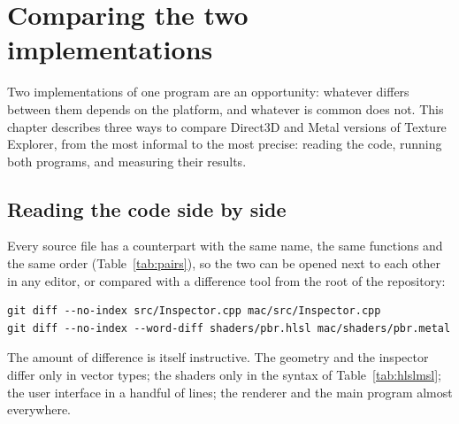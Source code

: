 \chapter{Comparing the two implementations}
\label{ch:comparing}

Two implementations of one program are an opportunity: whatever differs between them depends
on the platform, and whatever is common does not. This chapter describes three ways to compare
Direct3D and Metal versions of Texture Explorer, from the most informal to the most precise:
reading the code, running both programs, and measuring their results.

\section{Reading the code side by side}
Every source file has a counterpart with the same name, the same functions and the same order
(Table~\ref{tab:pairs}), so the two can be opened next to each other in any editor, or compared
with a difference tool from the root of the repository:
\begin{lstlisting}[language={},numbers=none,frame=none,basicstyle=\ttfamily\small]
git diff --no-index src/Inspector.cpp mac/src/Inspector.cpp
git diff --no-index --word-diff shaders/pbr.hlsl mac/shaders/pbr.metal
\end{lstlisting}
The amount of difference is itself instructive. The geometry and the inspector differ only in
vector types; the shaders only in the syntax of Table~\ref{tab:hlslmsl}; the user interface in a
handful of lines; the renderer and the main program almost everywhere.

